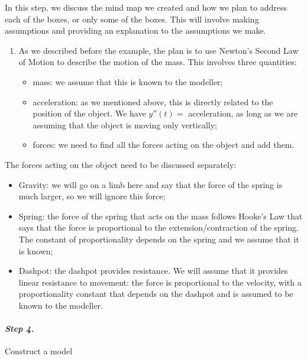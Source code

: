 \begin{example}
In this step, we discuss the mind map we created and how we plan to address each of the boxes, or only some of the boxes. This will involve making assumptions and providing an explanation to the assumptions we make.

\begin{enumerate}
	\item As we described before the example, the plan is to use Newton's Second Law of Motion to describe the motion of the mass. This involves three quantities:
	\begin{itemize}
		\item mass: we assume that this is known to the modeller;
		\item acceleration: as we mentioned above, this is directly related to the position of the object. We have $y''(t)=$ acceleration, as long as we are assuming that the object is moving only vertically;
		\item forces: we need to find all the forces acting on the object and add them.
	\end{itemize}
\end{enumerate}

The forces acting on the object need to be discussed separately:
\begin{itemize}
	\item Gravity: we will go on a limb here and say that the force of the spring is much larger, so we will ignore this force;
	\item Spring: the force of the spring that acts on the mass follows Hooke's Law that says that the force is proportional to the extension/contraction of the spring. The constant of proportionality depends on the spring and we assume that it is known;
	\item Dashpot: the dashpot provides resistance. We will assume that it provides linear resistance to movement: the force is proportional to the velocity, with a proportionality constant that depends on the dashpot and is assumed to be known to the modeller.
\end{itemize}
	
\end{example}


\paragraph{\emph{Step 4.}} Construct a model

